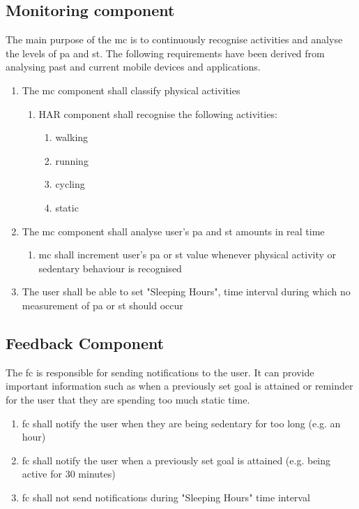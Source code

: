     
    \subsection{Monitoring component}
    The main purpose of the \gls{mc} is to continuously recognise activities and analyse the levels of \gls{pa} and \gls{st}. The following requirements have been derived from analysing past and current mobile devices and applications.
    
    \begin{enumerate}
        \item The \gls{mc} component shall classify physical activities
        \begin{enumerate}
            \item HAR component shall recognise the following activities:
            \begin{enumerate}
                \item walking
                \item running
                \item cycling
                \item static
            \end{enumerate}
        \end{enumerate}
        \item The \gls{mc} component shall analyse user's \gls{pa} and \gls{st} amounts in real time
            \begin{enumerate}
                \item \gls{mc} shall increment user's \gls{pa} or \gls{st} value whenever physical activity or sedentary behaviour is recognised
            \end{enumerate}
        \item The user shall be able to set "Sleeping Hours", time interval during which no measurement of \gls{pa} or \gls{st} should occur
      
    \end{enumerate}
    
    \subsection{Feedback Component}
    The \gls{fc} is responsible for sending notifications to the user. It can provide important information such as when a previously set goal is attained or reminder for the user that they are spending too much static time.
    \begin{enumerate}
        \item \gls{fc} shall notify the user when they are being sedentary for too long (e.g. an hour)
        
        \item \gls{fc} shall notify the user when a previously set goal is attained (e.g. being active for 30 minutes)
        
        \item \gls{fc} shall not send notifications during "Sleeping Hours" time interval
    \end{enumerate}

